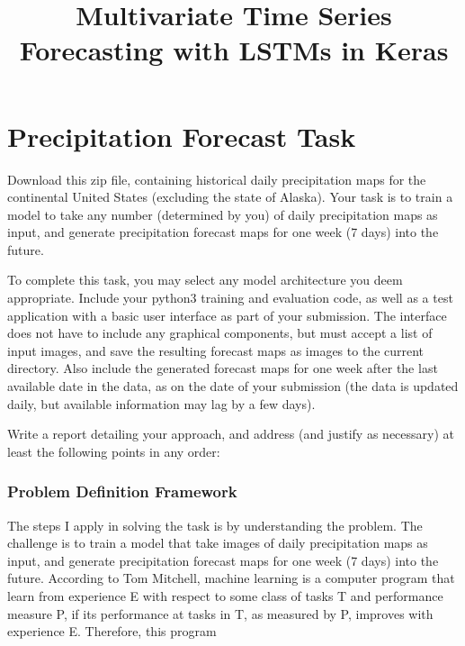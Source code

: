 \documentclass[11pt]{article}
\title{Multivariate Time Series Forecasting with LSTMs in Keras}
\begin{document}
    
    
    \maketitle
    
    

    
    \section{Precipitation Forecast Task}\label{precipitation-forecast-task}

Download this zip file, containing historical daily precipitation maps
for the continental United States (excluding the state of Alaska). Your
task is to train a model to take any number (determined by you) of daily
precipitation maps as input, and generate precipitation forecast maps
for one week (7 days) into the future.

To complete this task, you may select any model architecture you deem
appropriate. Include your python3 training and evaluation code, as well
as a test application with a basic user interface as part of your
submission. The interface does not have to include any graphical
components, but must accept a list of input images, and save the
resulting forecast maps as images to the current directory. Also include
the generated forecast maps for one week after the last available date
in the data, as on the date of your submission (the data is updated
daily, but available information may lag by a few days).

Write a report detailing your approach, and address (and justify as
necessary) at least the following points in any order:

    \subsubsection{Problem Definition
Framework}\label{problem-definition-framework}

The steps I apply in solving the task is by understanding the problem.
The challenge is to train a model that take images of daily
precipitation maps as input, and generate precipitation forecast maps
for one week (7 days) into the future. According to Tom Mitchell,
machine learning is a computer program that learn from experience E with
respect to some class of tasks T and performance measure P, if its
performance at tasks in T, as measured by P, improves with experience E.
Therefore, this program
\end{document}
